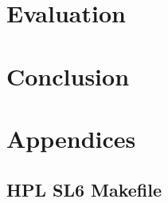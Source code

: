 \documentclass{article}
\begin{document}
\section{Evaluation}

\section{Conclusion}





















\printbibliography[title={Sources}]






































\appendix
    \section*{Appendices}
    \renewcommand{\thesubsection}{\Alph{subsection}}

    \subsection{HPL SL6 Makefile}
    \label{appendix:makefile}
\end{document}
